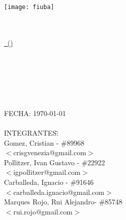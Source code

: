 

\begin{titlepage}

\thispagestyle{empty}

\begin{center}

\texttt{[image: fiuba]}\\[0.1cm]
\textsc{\universidad}\\[0.2cm]
\large{\textsc{\facultad}}\\[0.2cm]

\end{center}

\vfill

\begin{center}
\underline{\Large{\nombreMateria\, (\codigoMateria)}}
\end{center}

\vfill
\begin{center}

\end{center}
\vfill

\begin{center}
\Huge{\textsc{ \tituloTP }}\\[.5cm]
	\begin{figure}[H]
		\centering
	\end{figure}\HRule \\[0.1cm]
\Huge{\textbf{\descripcionTP}}\\[0.01cm]
\HRule\\[0.3cm]
\end{center}

\vfill



\begin{tabbing}
	FECHA: \today\\
\\
	INTEGRANTES:\hspace{-1cm}\=\+\hspace{1cm}\=\hspace{6cm}\=\\
		Gomez, Cristian	\>\>- \#89968\\
			\>\footnotesize{$<$crisgvenezia@gmail.com$>$}\\
		Pollitzer, Ivan Gustavo	\>\>- \#22922\\
			\>\footnotesize{$<$igpollitzer@gmail.com$>$}\\
		Carballeda, Ignacio	\>\>- \#91646\\
			\>\footnotesize{$<$carballeda.ignacio@gmail.com$>$}\\
		Marques Rojo, Rui Alejandro\>\>- \#85748\\
			\>\footnotesize{$<$rui.rojo@gmail.com$>$}\\			


\end{tabbing}
\end{titlepage}
